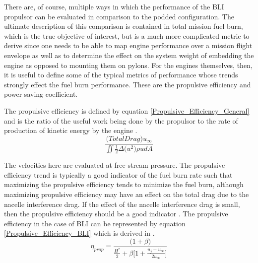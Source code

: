 \documentclass[12pt]{gatech-thesis}
\begin{document}
There are, of course, multiple ways in which the performance of the BLI propulsor can be evaluated in comparison to the podded configuration.  The ultimate description of this comparison is contained in total mission fuel burn, which is the true objective of interest, but is a much more complicated metric to derive since one needs to be able to map engine performance over a mission flight envelope as well as to determine the effect on the system weight of embedding the engine as opposed to mounting them on pylons.  For the engines themselves, then, it is useful to define some of the typical metrics of performance whose trends strongly effect the fuel burn performance.  These are the propulsive efficiency and power saving coefficient.  

\indent The propulsive efficiency is defined by equation \ref{Propulsive_Efficiency_General} and is the ratio of the useful work being done by the propulsor to the rate of production of kinetic energy by the engine \cite{Plas2007}.
   \begin{equation}\frac{\Big(Total Drag\Big)u_\infty}
			      {\displaystyle \iint{\frac{1}{2}\Delta\Big(u^2\Big)\rho u dA}}\label{Propulsive_Efficiency_General}\end{equation}%

The velocities here are evaluated at free-stream pressure.  The propulsive efficiency trend is typically a good indicator of the fuel burn rate such that maximizing the propulsive efficiency tends to minimize the fuel burn, although maximizing propulsive efficiency may have an effect on the total drag due to the nacelle interference drag.  If the effect of the nacelle interference drag is small, then the propulsive efficiency should be a good indicator \cite{Plas2007}.  The propulsive efficiency in the case of BLI can be represented by equation \ref{Propulsive_Efficiency_BLI} which is derived in \cite{Plas2007}.  
   \begin{equation}\eta_{prop} = \frac{\Big(1+\beta\Big)}
					{\displaystyle \frac{H^*}{2} + \beta\Big[1+\frac{u_j-u_\infty}{2u_\infty}\Big]}\label{Propulsive_Efficiency_BLI}\end{equation}%
\end{document}
